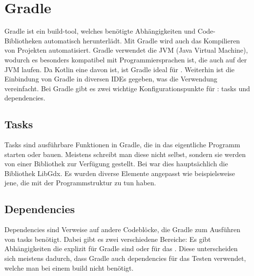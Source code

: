 
\renewcommand{\kapitelautor}{Autor: Felix Zwickelstorfer}
\section{Gradle}\label{sec:gradle}

\renewcommand{\kapitelautor}{Autor: Felix Zwickelstorfer}

Gradle ist ein build-tool, welches benötigte Abhängigkeiten und Code-Bibliotheken automatisch herunterlädt.
Mit Gradle wird auch das Kompilieren von Projekten automatisiert.
Gradle verwendet die JVM (Java Virtual Machine), wodurch es besonders kompatibel mit Programmiersprachen ist, die auch auf der JVM laufen.
Da Kotlin eine davon ist, ist Gradle ideal für \FF.
Weiterhin ist die Einbindung von Gradle in diversen IDEs gegeben, was die Verwendung vereinfacht.
Bei Gradle gibt es zwei wichtige Konfigurationspunkte für \FF: tasks und dependencies. 

\subsection{Tasks}\label{subsec:tasks}

Tasks sind ausführbare Funktionen in Gradle, die in \FF das eigentliche Programm starten oder bauen.
Meistens schreibt man diese nicht selbst, sondern sie werden von einer Bibliothek zur Verfügung gestellt.
Bei \FF war dies hauptsächlich die Bibliothek LibGdx.
Es wurden diverse Elemente angepasst wie beispielsweise jene, die mit der Programmstruktur zu tun haben.

\subsection{Dependencies}\label{subsec:dependencies}

Dependencies sind Verweise auf andere Codeblöcke, die Gradle zum Ausführen von tasks benötigt.
Dabei gibt es zwei verschiedene Bereiche: Es gibt Abhängigkeiten die explizit für Gradle sind oder für das .
Diese unterscheiden sich meistens dadurch, dass Gradle auch dependencies für das Testen verwendet, welche man bei einem build nicht benötigt.

\vfill
\pagebreak